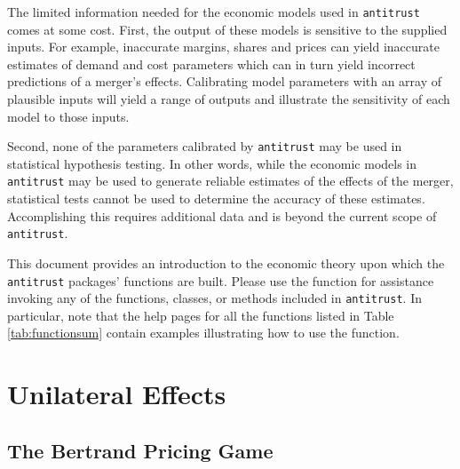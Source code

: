 \documentclass[11pt,numbers=noenddot,pointlessnumbers]{scrreprt}
\newcommand{\atr}{{\tt antitrust}}
\numberwithin{equation}{section}
\begin{document}
The limited information needed for the economic models used in \atr{} comes at some
cost. First, the output of these models is sensitive to the
supplied inputs. For example, inaccurate margins, shares and prices can yield
inaccurate estimates of demand and cost parameters which can in turn yield
incorrect predictions of a merger's effects. Calibrating model
parameters with an array of plausible inputs will yield a range of
outputs and illustrate the sensitivity of each model to those inputs.

Second, none of the parameters calibrated by \atr{} may be used
in statistical hypothesis testing. In other words, while the economic
models in \atr{} may be used to generate reliable estimates of the
effects of the merger, statistical tests cannot be used to
determine the accuracy of these estimates. Accomplishing this requires
additional data and is beyond the current scope of \atr{}.




This document provides an introduction to the economic theory upon
which the \atr{} packages' functions are built. Please use the
\verb@help@ function for assistance invoking any of the functions, classes, or
methods included in \atr{}. In particular, note that the help pages for all the
functions listed in Table \ref{tab:functionsum} contain examples
illustrating how to use the function.


\part{Unilateral Effects}
\chapter{The Bertrand Pricing Game}
\end{document}
